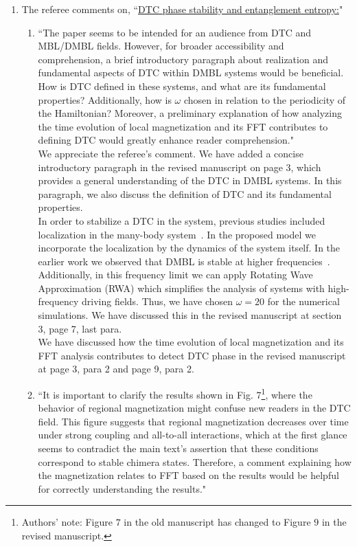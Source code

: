 \documentclass[aps,prb,reprint,showpacs,floatfix,superscriptaddress, onecolumn, nofootinbib, 10pt]{revtex4-2}
\newcommand{\response}[1]{{\color{black}#1}} %
\newcommand{\comment}[1]{{\color{blue}#1}} %
\begin{document}
\begin{enumerate}
\begin{enumerate}
		\item The referee comments on, \comment{``\underline{DTC phase stability and entanglement entropy:}"}
		\begin{enumerate}
			\item \comment{``The paper seems to be intended for an audience from DTC and MBL/DMBL fields. However, for broader accessibility and comprehension, a brief introductory paragraph about realization and fundamental aspects of DTC within DMBL
			systems would be beneficial. How is DTC defined in these systems, and what are its fundamental properties? Additionally, how is $\omega$ chosen in relation to the periodicity of the Hamiltonian? Moreover, a preliminary explanation of how analyzing the time evolution of local magnetization and its FFT contributes to defining DTC would greatly enhance reader comprehension."}\\
			
			\response{ 
			We appreciate the referee's comment. We have added a concise introductory paragraph in the revised manuscript on page 3, which provides a general understanding of the DTC in DMBL systems. In this paragraph, we also discuss the definition of DTC and its fundamental properties.\\

			In order to stabilize a DTC in the system, previous studies included localization in the many-body system~\cite{Zhang2017, Zaletel2023}. In the proposed model we incorporate the localization by the dynamics of the system itself. In the earlier work we observed that DMBL is stable at higher frequencies~\cite{Mahbub2024}. Additionally, in this frequency limit we can apply Rotating Wave Approximation (RWA) which simplifies the analysis of systems with high-frequency driving fields. Thus, we have chosen $\omega=20$ for the numerical simulations. We have discussed this in the revised manuscript at section 3, page 7, last para.\\

			We have discussed how the time evolution of local magnetization and its FFT analysis contributes to detect DTC phase in the revised manuscript at page 3, para 2 and page 9, para 2.
			}\\

			\item \comment{``It is important to clarify the results shown in Fig. 7\footnote{Authors' note: Figure $7$ in the old manuscript has changed to Figure $9$ in the revised manuscript.}, where the behavior of regional magnetization might confuse new readers in the DTC field. This figure suggests that regional magnetization decreases over time under strong coupling and all-to-all interactions, which at the first glance seems to contradict the main text’s assertion that these conditions correspond to stable chimera states. Therefore, a comment  explaining how the magnetization relates to FFT based on the results would be helpful for correctly understanding the results."}\\
			

\end{enumerate}
\end{enumerate}
\end{enumerate}
\end{document}
